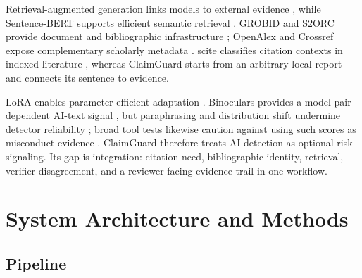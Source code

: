 \documentclass[12pt,toc=bib,toc=listof]{scrartcl}
\begin{document}
Retrieval-augmented generation links models to external evidence \cite{lewis2020}, while Sentence-BERT supports efficient semantic retrieval \cite{reimers2019}. GROBID and S2ORC provide document and bibliographic infrastructure \cite{lopez2009,lo2020}; OpenAlex and Crossref expose complementary scholarly metadata \cite{priem2022,crossref}. scite classifies citation contexts in indexed literature \cite{nicholson2021}, whereas ClaimGuard starts from an arbitrary local report and connects its sentence to evidence.

LoRA enables parameter-efficient adaptation \cite{hu2022}. Binoculars provides a model-pair-dependent AI-text signal \cite{hans2024}, but paraphrasing and distribution shift undermine detector reliability \cite{sadasivan2023}; broad tool tests likewise caution against using such scores as misconduct evidence \cite{weberwulff2023}. ClaimGuard therefore treats AI detection as optional risk signaling. Its gap is integration: citation need, bibliographic identity, retrieval, verifier disagreement, and a reviewer-facing evidence trail in one workflow.

\section{System Architecture and Methods}

\subsection{Pipeline}
\end{document}
